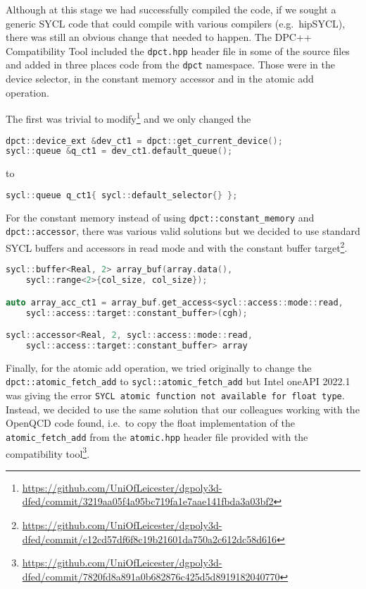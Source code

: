 \documentclass[../main]{subfiles}
\begin{document}
Although at this stage we had successfully compiled the code, if we sought a generic SYCL code that could compile with various compilers (e.g.\ hipSYCL), there was still an obvious change that needed to happen.
The DPC++ Compatibility Tool included the \texttt{dpct.hpp} header file in some of the source files and added in three places code from the \texttt{dpct} namespace.
Those were in the device selector, in the constant memory accessor and in the atomic add operation.

The first was trivial to modify\footnote{\url{https://github.com/UniOfLeicester/dgpoly3d-dfed/commit/3219aa05f4a95bc719fa1e7aae141fbda3a03bf2}} and we only changed the
\begin{lstlisting}[language=C++]
dpct::device_ext &dev_ct1 = dpct::get_current_device();
sycl::queue &q_ct1 = dev_ct1.default_queue();
\end{lstlisting}
to
\begin{lstlisting}[language=C++]
sycl::queue q_ct1{ sycl::default_selector{} };
\end{lstlisting}

For the constant memory instead of using \texttt{dpct::constant\_memory} and \texttt{dpct::accessor}, there was various valid solutions but we decided to use standard SYCL buffers and accessors in read mode and with the constant buffer target\footnote{\url{https://github.com/UniOfLeicester/dgpoly3d-dfed/commit/c12cd57df6f8c19b21601da750a2c612dc58d616}}.
\begin{lstlisting}[language=C++]
sycl::buffer<Real, 2> array_buf(array.data(),
    sycl::range<2>{col_size, col_size});

auto array_acc_ct1 = array_buf.get_access<sycl::access::mode::read,
    sycl::access::target::constant_buffer>(cgh);

sycl::accessor<Real, 2, sycl::access::mode::read,
    sycl::access::target::constant_buffer> array
\end{lstlisting}

Finally, for the atomic add operation, we tried originally to change the \lstinline[basicstyle=\normalsize\ttfamily,breaklines=true,
	breakatwhitespace=false,language=sh]{dpct::atomic_fetch_add} to \texttt{sycl::atomic\_fetch\_add} but Intel oneAPI 2022.1 was giving the error \texttt{SYCL atomic function not available for float type}.
Instead, we decided to use the same solution that our colleagues working with the OpenQCD code found, i.e.\ to copy the float implementation of the \texttt{atomic\_fetch\_add} from the \texttt{atomic.hpp} header file provided with the compatibility tool\footnote{\url{https://github.com/UniOfLeicester/dgpoly3d-dfed/commit/7820fd8a891a0b682876c425d5d8919182040770}}.
\end{document}
